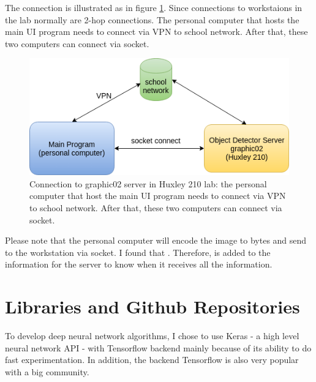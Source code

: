 The connection is illustrated as in figure \ref{fig:socketConnect}. Since connections to workstaions in the lab normally are 2-hop connections. The personal computer that hosts the main UI program needs to connect via VPN to school network. After that, these two computers can connect via socket.
\begin{figure}[bh!]
	\centering
	\includegraphics[width=0.8\hsize]{./figures/socketConnect}
	\caption{Connection to graphic02 server in Huxley 210 lab: the personal computer that host the main UI program needs to connect via VPN to school network. After that, these two computers can connect via socket.}
	\label{fig:socketConnect}
\end{figure}

Please note that the personal computer will encode the image to bytes and send to the workstation via socket. I found that . Therefore,  is added to the information for the server to know when it receives all the information.

\section{Libraries and Github Repositories}
\label{sec:github}
To develop deep neural network algorithms, I chose to use Keras \cite{chollet2015keras} - a high level neural network API - with Tensorflow \cite{DBLP:journals/corr/AbadiABBCCCDDDG16} backend mainly because of its ability to do fast experimentation. In addition, the backend Tensorflow is also very popular with a big community.

